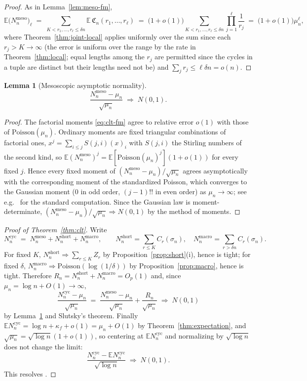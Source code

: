 \documentclass[11pt]{article}
\newcommand{\E}{\mathbb{E}}
\newcommand{\1}{\mathbf{1}}
\newcommand{\cyc}{\mathrm{cyc}}
\newcommand{\Poisson}{\mathrm{Poisson}}
\newtheorem{lemma}[theorem]{Lemma}
\theoremstyle{remark}
\begin{document}
\begin{proof}
As in Lemma~\ref{lem:meso-fm},
\[
\E\bigl(N_n^{\mathrm{meso}}\bigr)_\ell
\;=\;\sum_{K<r_1,\dots,r_\ell\le\delta n}
\E\,\mathfrak{C}_n(r_1,\dots,r_\ell)
\;=\;\bigl(1+o(1)\bigr)
\sum_{K<r_1,\dots,r_\ell\le\delta n}\prod_{j=1}^\ell\frac1{r_j}
\;=\;\bigl(1+o(1)\bigr)\mu_n^\ell,
\]
where Theorem~\ref{thm:joint-local} applies uniformly over the sum since
each $r_j>K\to\infty$ (the error is uniform over the range by the rate in
Theorem~\ref{thm:local}; equal lengths among the $r_j$ are permitted since
the cycles in a tuple are distinct but their lengths need not be) and
$\sum_j r_j\le\ell\delta n=o(n)$.
\end{proof}

\begin{lemma}[Mesoscopic asymptotic normality]\label{lem:meso-normal}
\[
\frac{N_n^{\mathrm{meso}}-\mu_n}{\sqrt{\mu_n}}\;\Rightarrow\;N(0,1).
\]
\end{lemma}

\begin{proof}
The factorial moments \eqref{eq:clt-fm} agree to relative error $o(1)$ with
those of $\Poisson(\mu_n)$. Ordinary moments are fixed triangular
combinations of factorial ones, $x^j=\sum_{i\le j}S(j,i)(x)_i$ with $S(j,i)$
the Stirling numbers of the second kind, so
$\E(N_n^{\mathrm{meso}})^j=\E[\Poisson(\mu_n)^j](1+o(1))$ for every fixed
$j$. Hence every fixed moment of
$(N_n^{\mathrm{meso}}-\mu_n)/\sqrt{\mu_n}$ agrees asymptotically with the
corresponding moment of the standardized Poisson, which converges to the
Gaussian moment ($0$ in odd order, $(j-1)!!$ in even order) as
$\mu_n\to\infty$; see e.g.\ \cite{BHJ92} for the standard computation.
Since the Gaussian law is moment-determinate,
$(N_n^{\mathrm{meso}}-\mu_n)/\sqrt{\mu_n}\Rightarrow N(0,1)$ by the method
of moments.
\end{proof}

\begin{proof}[Proof of Theorem~\ref{thm:clt}]
Write
\[
N_n^{\cyc}\;=\;N_n^{\mathrm{meso}}+N_n^{\mathrm{short}}+N_n^{\mathrm{macro}},
\qquad
N_n^{\mathrm{short}}=\sum_{r\le K}C_r(\sigma_n),\quad
N_n^{\mathrm{macro}}=\sum_{r>\delta n}C_r(\sigma_n).
\]
For fixed $K$, $N_n^{\mathrm{short}}\Rightarrow\sum_{r\le K}Z_r$ by
Proposition~\ref{prop:short}(i), hence is tight; for fixed $\delta$,
$N_n^{\mathrm{macro}}\Rightarrow\Poisson(\log(1/\delta))$ by
Proposition~\ref{prop:macro}, hence is tight. Therefore
$R_n=N_n^{\mathrm{short}}+N_n^{\mathrm{macro}}=O_p(1)$ and, since
$\mu_n=\log n+O(1)\to\infty$,
\[
\frac{N_n^{\cyc}-\mu_n}{\sqrt{\mu_n}}
\;=\;\frac{N_n^{\mathrm{meso}}-\mu_n}{\sqrt{\mu_n}}+\frac{R_n}{\sqrt{\mu_n}}
\;\Rightarrow\;N(0,1)
\]
by Lemma~\ref{lem:meso-normal} and Slutsky's theorem. Finally
$\E N_n^{\cyc}=\log n+\kappa_f+o(1)=\mu_n+O(1)$ by
Theorem~\ref{thm:expectation}, and
$\sqrt{\mu_n}=\sqrt{\log n}(1+o(1))$, so centering at $\E N_n^{\cyc}$ and
normalizing by $\sqrt{\log n}$ does not change the limit:
\[
\frac{N_n^{\cyc}-\E N_n^{\cyc}}{\sqrt{\log n}}\;\Rightarrow\;N(0,1).
\]
This resolves \cite[Conjecture~13.2]{Lon26}.
\end{proof}
\end{document}
